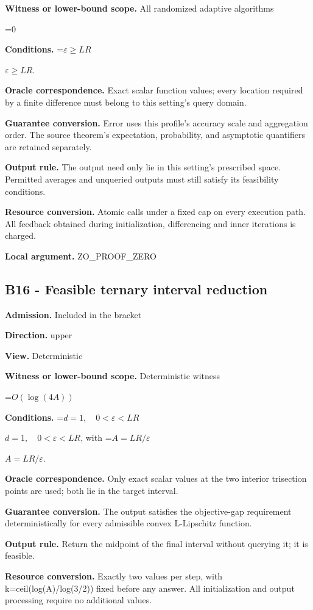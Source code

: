 \documentclass[10pt,a4paper]{article}
\newcommand{\AtlasMath}[1]{\par\begingroup\centering\setbox0=\hbox{$\displaystyle #1$}\ifdim\wd0>1.4\linewidth\typeout{ATLAS WIDE FORMULA: \the\wd0}\fi\ifdim\wd0>\linewidth\resizebox{\linewidth}{!}{\box0}\else\box0\fi\par\endgroup}
\newcommand{\AtlasInlineMath}[1]{\begingroup\setbox0=\hbox{$#1$}\ifdim\wd0>.4\linewidth\endgroup\AtlasMath{#1}\else\endgroup$#1$\fi}
\begin{document}
\textbf{Witness or lower-bound scope.} All randomized adaptive algorithms

\AtlasMath{0}
\textbf{Conditions.} \AtlasInlineMath{\varepsilon\ge LR}.

\textbf{Oracle correspondence.} Exact scalar function values; every location required by a finite difference must belong to this setting's query domain.

\textbf{Guarantee conversion.} Error uses this profile's accuracy scale and aggregation order. The source theorem's expectation, probability, and asymptotic quantifiers are retained separately.

\textbf{Output rule.} The output need only lie in this setting's prescribed space. Permitted averages and unqueried outputs must still satisfy its feasibility conditions.

\textbf{Resource conversion.} Atomic calls under a fixed cap on every execution path. All feedback obtained during initialization, differencing and inner iterations is charged.

\textbf{Local argument.} ZO\_\allowbreak{}PROOF\_\allowbreak{}ZERO

\subsection{B16 - Feasible ternary interval reduction}
\textbf{Admission.} Included in the bracket

\textbf{Direction.} upper

\textbf{View.} Deterministic

\textbf{Witness or lower-bound scope.} Deterministic witness

\AtlasMath{O(\log(4A))}
\textbf{Conditions.} \AtlasInlineMath{d=1,\quad 0<\varepsilon<LR}, with \AtlasInlineMath{A=LR/\varepsilon}.

\textbf{Oracle correspondence.} Only exact scalar values at the two interior trisection points are used; both lie in the target interval.

\textbf{Guarantee conversion.} The output satisfies the objective-gap requirement deterministically for every admissible convex L-Lipschitz function.

\textbf{Output rule.} Return the midpoint of the final interval without querying it; it is feasible.

\textbf{Resource conversion.} Exactly two values per step, with k=ceil(log(A)/log(3/2)) fixed before any answer. All initialization and output processing require no additional values.
\end{document}
